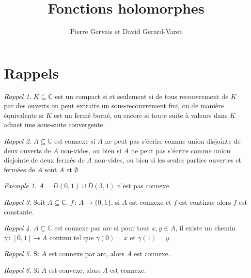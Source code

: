 \documentclass[]{article}
\title{Fonctions holomorphes}
\author{Pierre Gervais et David Gerard-Varet}
\theoremstyle{remark}
\newtheorem{myexmpl}{Exemple}
\newtheorem{myrapl}{Rappel}
\theoremstyle{definition}
\newcommand{\funcshort}[3]{
	#1 \, : \, #2 \longrightarrow #3
}
\begin{document}
\maketitle

\tableofcontents

\newpage

\section{Rappels}

\begin{myrapl}
	$K \subseteq \mathbb{C}$ est un compact si et seulement si de tous recouvrement de $K$ par des ouverts on peut extraire un sous-recouvrement fini, ou de manière équivalente si $K$ est un fermé borné, ou encore si toute suite à valeurs dans $K$ admet une sous-suite convergente.
\end{myrapl}

\begin{myrapl}
	$A \subseteq \mathbb{C}$ est connexe si $A$ ne peut pas s'écrire comme union disjointe de deux ouverts de $A$ non-vides, ou bien si $A$ ne peut pas s'écrire comme union disjointe de deux fermés de $A$ non-vides, ou bien si les seules parties ouvertes et fermées de $A$ sont $A$ et $\emptyset$.
\end{myrapl}

\begin{myexmpl}
	$A = D(0, 1) \cup \overline{D}(3, 1)$ n'est pas connexe.
\end{myexmpl}

\begin{myrapl}
	Soit $A \subseteq \mathbb{C}$, $\funcshort{f}{A}{\{0, 1\}}$, si $A$ est connexe et $f$ est continue alors $f$ est constante.
\end{myrapl}

\begin{myrapl}
	$A \subseteq \mathbb{C}$ est connexe par arc si pour tous $x, y \in A$, il existe un chemin $\funcshort{\gamma}{[0, 1]}{A}$ continu tel que $\gamma(0)=x$ et $\gamma(1)=y$.
\end{myrapl}

\begin{myrapl}
	Si $A$ est connexe par arc, alors $A$ est connexe.
\end{myrapl}

\begin{myrapl}
	Si $A$ est convexe, alors $A$ est connexe.
\end{myrapl}
\end{document}
